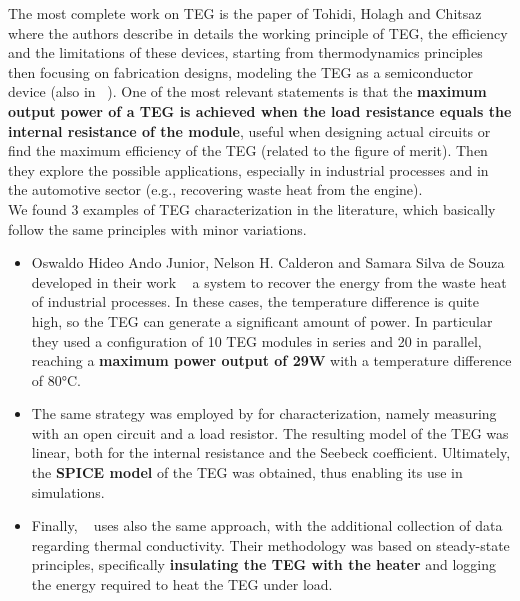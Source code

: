 The most complete work on TEG is the paper of Tohidi, Holagh and Chitsaz ~\cite{TOHIDI2022117793} where the authors describe in details the working principle of TEG, the efficiency and the limitations of these devices, starting from thermodynamics principles then focusing on fabrication designs, modeling the TEG as a semiconductor device (also in ~\cite{Tian16}). One of the most relevant statements is that the \textbf{maximum output power of a TEG is achieved when the load resistance equals the internal resistance of the module}, useful when designing actual circuits or find the maximum efficiency of the TEG (related to the figure of merit). Then they explore the possible applications, especially in industrial processes and in the automotive sector (e.g., recovering waste heat from the engine).
\\
We found 3 examples of TEG characterization in the literature, which basically follow the same principles with minor variations.

\begin{itemize}
  \item Oswaldo Hideo Ando Junior, Nelson H. Calderon and Samara Silva de Souza developed in their work ~\cite{en11061555} a system to recover the energy from the waste heat of industrial processes. In these cases, the temperature difference is quite high, so the TEG can generate a significant amount of power. In particular they used a configuration of 10 TEG modules in series and 20 in parallel, reaching a \textbf{maximum power output of 29W} with a temperature difference of 80°C.
  \item The same strategy was employed by \cite{CARMO20112194} for characterization, namely measuring with an open circuit and a load resistor. The resulting model of the TEG was linear, both for the internal resistance and the Seebeck coefficient. Ultimately, the \textbf{SPICE model} of the TEG was obtained, thus enabling its use in simulations. 
  \item Finally, ~\cite{10209119} uses also the same approach, with the additional collection of data regarding thermal conductivity. Their methodology was based on steady-state principles, specifically \textbf{insulating the TEG with the heater} and logging the energy required to heat the TEG under load.   
\end{itemize}